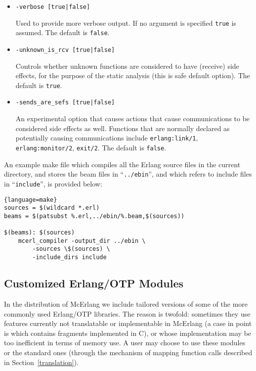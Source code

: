 \documentclass[a4paper]{article}
\begin{document}
\begin{itemize}
\item
\begin{lstlisting}
-verbose [true|false]
\end{lstlisting}
Used to provide more verbose output. If no argument
is specified \texttt{true} is assumed. The default is \texttt{false}.

\item
\begin{lstlisting}
-unknown_is_rcv [true|false]
\end{lstlisting}
Controls whether unknown functions are considered to have
(receive) side effects, for the purpose of the static analysis
(this is safe default option). The default is \texttt{true}.

\item
\begin{lstlisting}
-sends_are_sefs [true|false]
\end{lstlisting}
An experimental option that causes actions that cause communications
to be considered side effects as well. Functions that are normally
declared as potentially causing communications 
include \lstinline{erlang:link/1},
\lstinline{erlang:monitor/2}, \lstinline{exit/2}.
The default is \texttt{false}.
\end{itemize}

An example make file which compiles all the Erlang source files in the 
current directory, and stores the beam files in ``\texttt{../ebin}'',
and which refers to include files in ``\texttt{include}'', is provided
below:
\begin{lstlisting}{language=make}
sources = $(wildcard *.erl)
beams = $(patsubst %.erl,../ebin/%.beam,$(sources))

$(beams): $(sources)
	mcerl_compiler -output_dir ../ebin \
        -sources \$(sources) \
        -include_dirs include
\end{lstlisting}

\subsection{Customized Erlang/OTP Modules}

In the distribution of McErlang we include
tailored versions of some of the more
commonly used Erlang/OTP libraries. The reason is twofold:
sometimes they use features currently not translatable or implementable
in McErlang (a case in point is \lstinline@lists@ which
contains fragments implemented in C), or whose implementation
may be too inefficient in terms of memory use.
A user may choose to use these modules or the standard ones (through the
mechanism of mapping function calls described in Section~\ref{translation}).
\end{document}
